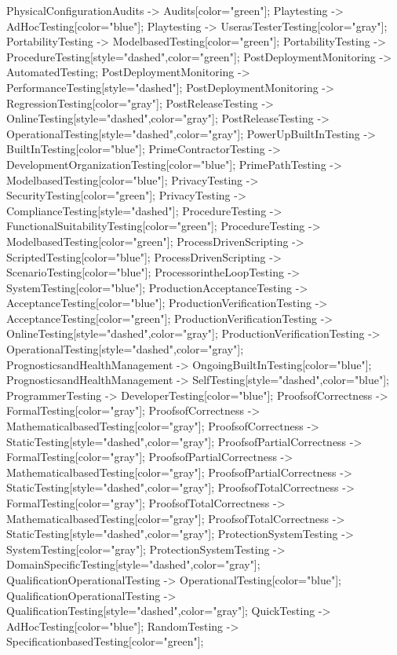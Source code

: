 \documentclass{article}
\begin{document}
{PhysicalConfigurationAudits -> Audits[color="green"];
Playtesting -> AdHocTesting[color="blue"];
Playtesting -> UserasTesterTesting[color="gray"];
PortabilityTesting -> ModelbasedTesting[color="green"];
PortabilityTesting -> ProcedureTesting[style="dashed",color="green"];
PostDeploymentMonitoring -> AutomatedTesting;
PostDeploymentMonitoring -> PerformanceTesting[style="dashed"];
PostDeploymentMonitoring -> RegressionTesting[color="gray"];
PostReleaseTesting -> OnlineTesting[style="dashed",color="gray"];
PostReleaseTesting -> OperationalTesting[style="dashed",color="gray"];
PowerUpBuiltInTesting -> BuiltInTesting[color="blue"];
PrimeContractorTesting -> DevelopmentOrganizationTesting[color="blue"];
PrimePathTesting -> ModelbasedTesting[color="blue"];
PrivacyTesting -> SecurityTesting[color="green"];
PrivacyTesting -> ComplianceTesting[style="dashed"];
ProcedureTesting -> FunctionalSuitabilityTesting[color="green"];
ProcedureTesting -> ModelbasedTesting[color="green"];
ProcessDrivenScripting -> ScriptedTesting[color="blue"];
ProcessDrivenScripting -> ScenarioTesting[color="blue"];
ProcessorintheLoopTesting -> SystemTesting[color="blue"];
ProductionAcceptanceTesting -> AcceptanceTesting[color="blue"];
ProductionVerificationTesting -> AcceptanceTesting[color="green"];
ProductionVerificationTesting -> OnlineTesting[style="dashed",color="gray"];
ProductionVerificationTesting -> OperationalTesting[style="dashed",color="gray"];
PrognosticsandHealthManagement -> OngoingBuiltInTesting[color="blue"];
PrognosticsandHealthManagement -> SelfTesting[style="dashed",color="blue"];
ProgrammerTesting -> DeveloperTesting[color="blue"];
ProofsofCorrectness -> FormalTesting[color="gray"];
ProofsofCorrectness -> MathematicalbasedTesting[color="gray"];
ProofsofCorrectness -> StaticTesting[style="dashed",color="gray"];
ProofsofPartialCorrectness -> FormalTesting[color="gray"];
ProofsofPartialCorrectness -> MathematicalbasedTesting[color="gray"];
ProofsofPartialCorrectness -> StaticTesting[style="dashed",color="gray"];
ProofsofTotalCorrectness -> FormalTesting[color="gray"];
ProofsofTotalCorrectness -> MathematicalbasedTesting[color="gray"];
ProofsofTotalCorrectness -> StaticTesting[style="dashed",color="gray"];
ProtectionSystemTesting -> SystemTesting[color="gray"];
ProtectionSystemTesting -> DomainSpecificTesting[style="dashed",color="gray"];
QualificationOperationalTesting -> OperationalTesting[color="blue"];
QualificationOperationalTesting -> QualificationTesting[style="dashed",color="gray"];
QuickTesting -> AdHocTesting[color="blue"];
RandomTesting -> SpecificationbasedTesting[color="green"];
}
\end{document}

